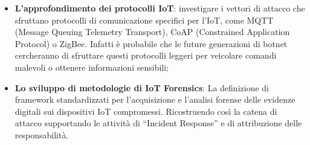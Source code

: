 \begin{itemize}
\item \textbf{L'approfondimento dei protocolli IoT}: investigare i vettori di attacco che sfruttano protocolli di comunicazione specifici per l'IoT, come MQTT (Message Queuing Telemetry Transport), CoAP (Constrained Application Protocol) o ZigBee. Infatti è probabile che le future generazioni di botnet cercheranno di sfruttare questi protocolli leggeri per veicolare comandi malevoli o ottenere informazioni sensibili;

\item \textbf{Lo sviluppo di metodologie di IoT Forensics}: La definizione di framework standardizzati per l'acquisizione e l'analisi forense delle evidenze digitali sui dispositivi IoT compromessi. Ricostruendo così la catena di attacco supportando le attività di ``Incident Response'' e di attribuzione delle responsabilità.
\end{itemize}
